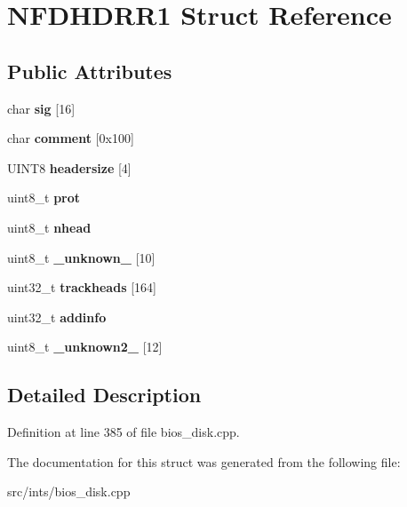\hypertarget{structNFDHDRR1}{\section{N\-F\-D\-H\-D\-R\-R1 Struct Reference}
\label{structNFDHDRR1}
}
\subsection*{Public Attributes}
\begin{DoxyCompactItemize}
\item 
\hypertarget{structNFDHDRR1_a88c7b4320bd3b63517da741c8acbdd26}{char {\bfseries sig} \mbox{[}16\mbox{]}}\label{structNFDHDRR1_a88c7b4320bd3b63517da741c8acbdd26}

\item 
\hypertarget{structNFDHDRR1_aac2dabcaf3225121f4ac747b638184e6}{char {\bfseries comment} \mbox{[}0x100\mbox{]}}\label{structNFDHDRR1_aac2dabcaf3225121f4ac747b638184e6}

\item 
\hypertarget{structNFDHDRR1_abe4da2c967610d416a133a6873827358}{U\-I\-N\-T8 {\bfseries headersize} \mbox{[}4\mbox{]}}\label{structNFDHDRR1_abe4da2c967610d416a133a6873827358}

\item 
\hypertarget{structNFDHDRR1_a25243b1e51b29f3d3b6d84f456b5ffd5}{uint8\-\_\-t {\bfseries prot}}\label{structNFDHDRR1_a25243b1e51b29f3d3b6d84f456b5ffd5}

\item 
\hypertarget{structNFDHDRR1_a7a989484ceb7866b317a05db688d8ad8}{uint8\-\_\-t {\bfseries nhead}}\label{structNFDHDRR1_a7a989484ceb7866b317a05db688d8ad8}

\item 
\hypertarget{structNFDHDRR1_a824fa111f184422b485041fa29d2775d}{uint8\-\_\-t {\bfseries \-\_\-unknown\-\_\-} \mbox{[}10\mbox{]}}\label{structNFDHDRR1_a824fa111f184422b485041fa29d2775d}

\item 
\hypertarget{structNFDHDRR1_aa033251a32e455d71aa6602d92c0aed1}{uint32\-\_\-t {\bfseries trackheads} \mbox{[}164\mbox{]}}\label{structNFDHDRR1_aa033251a32e455d71aa6602d92c0aed1}

\item 
\hypertarget{structNFDHDRR1_a6842fd4156f843a938c03367460b93ee}{uint32\-\_\-t {\bfseries addinfo}}\label{structNFDHDRR1_a6842fd4156f843a938c03367460b93ee}

\item 
\hypertarget{structNFDHDRR1_aa17d043d75862352c19ffb2667ea647b}{uint8\-\_\-t {\bfseries \-\_\-unknown2\-\_\-} \mbox{[}12\mbox{]}}\label{structNFDHDRR1_aa17d043d75862352c19ffb2667ea647b}

\end{DoxyCompactItemize}


\subsection{Detailed Description}


Definition at line 385 of file bios\-\_\-disk.\-cpp.



The documentation for this struct was generated from the following file\-:\begin{DoxyCompactItemize}
\item 
src/ints/bios\-\_\-disk.\-cpp\end{DoxyCompactItemize}
